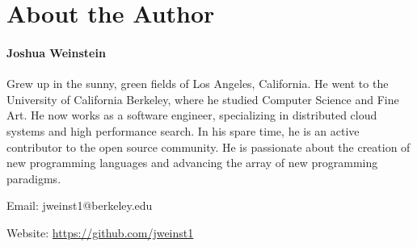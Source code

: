
\newpage

\section{About the Author}

\paragraph{Joshua Weinstein} Grew up in the sunny, green fields of Los Angeles, California. He went to the University of California Berkeley, where he studied Computer Science and Fine Art. He now works as a software engineer, specializing in distributed cloud systems and high performance search. In his spare time, he is an active contributor to the open source community. He is passionate about the creation of new programming languages and advancing the array of new programming paradigms.

Email: jweinst1@berkeley.edu

Website: \url{https://github.com/jweinst1}

